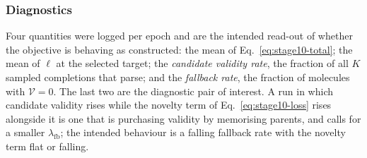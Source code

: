 \documentclass[a4paper,12pt]{article}
\begin{document}
\subsubsection{Diagnostics}

Four quantities were logged per epoch and are the intended read-out of whether
the objective is behaving as constructed: the mean of
Eq.~\eqref{eq:stage10-total}; the mean of $\ell$ at the selected target; the
\emph{candidate validity rate}, the fraction of all $K$ sampled completions that
parse; and the \emph{fallback rate}, the fraction of molecules with
$\mathcal{V}=0$. The last two are the diagnostic pair of interest. A run in
which candidate validity rises while the novelty term of
Eq.~\eqref{eq:stage10-loss} rises alongside it is one that is purchasing
validity by memorising parents, and calls for a smaller $\lambda_{\mathrm{fb}}$;
the intended behaviour is a falling fallback rate with the novelty term flat or
falling.
\end{document}
